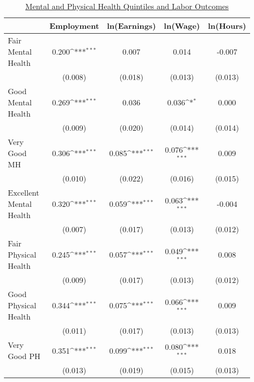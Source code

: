 \def\sym#1{\ifmmode^{#1}\else\(^{#1}\)\fi}
\begin{table}
\center\caption*{\large{\underline{Mental and Physical Health Quintiles  and Labor Outcomes}}}
\vspace{0.2cm}
\begin{tabular}{l*{4}{c}}
                    &\multicolumn{1}{c}{Employment}&\multicolumn{1}{c}{ln(Earnings)}&\multicolumn{1}{c}{ln(Wage)}&\multicolumn{1}{c}{ln(Hours)}\\
\midrule
Fair Mental Health  &       0.200\sym{***}&       0.007         &       0.014         &      -0.007         \\
                    &     (0.008)         &     (0.018)         &     (0.013)         &     (0.013)         \\
Good Mental Health  &       0.269\sym{***}&       0.036         &       0.036\sym{*}  &       0.000         \\
                    &     (0.009)         &     (0.020)         &     (0.014)         &     (0.014)         \\
Very Good MH        &       0.306\sym{***}&       0.085\sym{***}&       0.076\sym{***}&       0.009         \\
                    &     (0.010)         &     (0.022)         &     (0.016)         &     (0.015)         \\
Excellent Mental Health&       0.320\sym{***}&       0.059\sym{***}&       0.063\sym{***}&      -0.004         \\
                    &     (0.007)         &     (0.017)         &     (0.013)         &     (0.012)         \\
\midrule
Fair Physical Health&       0.245\sym{***}&       0.057\sym{***}&       0.049\sym{***}&       0.008         \\
                    &     (0.009)         &     (0.017)         &     (0.013)         &     (0.012)         \\
Good Physical Health&       0.344\sym{***}&       0.075\sym{***}&       0.066\sym{***}&       0.009         \\
                    &     (0.011)         &     (0.017)         &     (0.013)         &     (0.013)         \\
Very Good PH        &       0.351\sym{***}&       0.099\sym{***}&       0.080\sym{***}&       0.018         \\
                    &     (0.013)         &     (0.019)         &     (0.015)         &     (0.013)         \\

\end{tabular}
\end{table}
